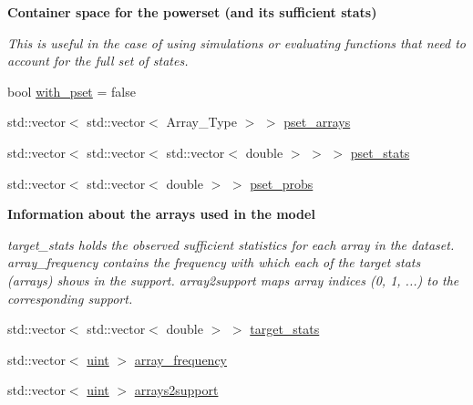 \begin{Indent}\textbf{ Container space for the powerset (and its sufficient stats)}\par
{\em This is useful in the case of using simulations or evaluating functions that need to account for the full set of states. }\begin{DoxyCompactItemize}
\item 
bool \hyperlink{class_model_afd37924e6fcfdc30c9fc5ad56f1c4947}{with\+\_\+pset} = false
\item 
std\+::vector$<$ std\+::vector$<$ Array\+\_\+\+Type $>$ $>$ \hyperlink{class_model_a875ac0dbc320797c843b6724b7736f77}{pset\+\_\+arrays}
\item 
std\+::vector$<$ std\+::vector$<$ std\+::vector$<$ double $>$ $>$ $>$ \hyperlink{class_model_a89fff457ecccc91a624e20cafbf3e765}{pset\+\_\+stats}
\item 
std\+::vector$<$ std\+::vector$<$ double $>$ $>$ \hyperlink{class_model_a5dea24375889e55064f052fd8e8c4fe2}{pset\+\_\+probs}
\end{DoxyCompactItemize}
\end{Indent}
\begin{Indent}\textbf{ Information about the arrays used in the model}\par
{\em {\ttfamily target\+\_\+stats} holds the observed sufficient statistics for each array in the dataset. {\ttfamily array\+\_\+frequency} contains the frequency with which each of the target stats (arrays) shows in the support. {\ttfamily array2support} maps array indices (0, 1, ...) to the corresponding support. }\begin{DoxyCompactItemize}
\item 
std\+::vector$<$ std\+::vector$<$ double $>$ $>$ \hyperlink{class_model_a24ad6e57bff2297dcc7461609714f41b}{target\+\_\+stats}
\item 
std\+::vector$<$ \hyperlink{typedefs_8hpp_a91ad9478d81a7aaf2593e8d9c3d06a14}{uint} $>$ \hyperlink{class_model_a8470b5bb905b692f24a3e5197f8680ed}{array\+\_\+frequency}
\item 
std\+::vector$<$ \hyperlink{typedefs_8hpp_a91ad9478d81a7aaf2593e8d9c3d06a14}{uint} $>$ \hyperlink{class_model_a038858e9cd8e396412c3867113a149e7}{arrays2support}
\end{DoxyCompactItemize}
\end{Indent}
